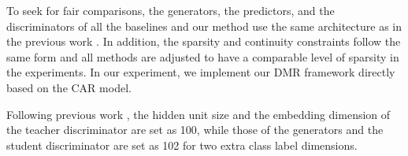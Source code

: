 \documentclass[letterpaper]{article} %
\begin{document}
To seek for fair comparisons, the generators, the predictors, and the discriminators of all the baselines and our method use the same architecture as in the previous work \cite{chang2019game}. In addition, the sparsity and continuity constraints follow the same form and all methods are adjusted to have a comparable level of sparsity in the experiments. 
In our experiment, we implement our DMR framework directly based on the CAR model. 

Following previous work \cite{chang2019game}, the hidden unit size and the embedding dimension of the teacher discriminator are set as 100, while those of the generators and the student discriminator are set as 102 for two extra class label dimensions. 
\end{document}
